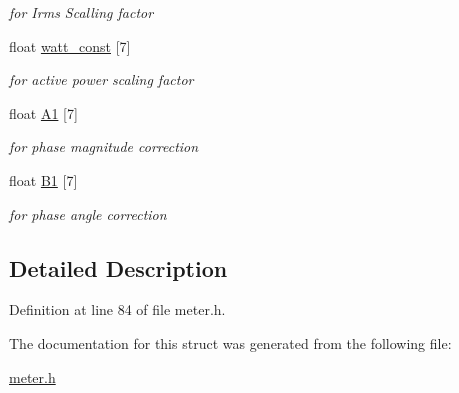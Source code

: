 \begin{DoxyCompactItemize}
\begin{DoxyCompactList}\small\item\em for Irms Scalling factor \end{DoxyCompactList}\item 
\hypertarget{structcoefficient_a7d98671ef11d3a3eb965e37d41df2c24}{float \hyperlink{structcoefficient_a7d98671ef11d3a3eb965e37d41df2c24}{watt\-\_\-const} \mbox{[}7\mbox{]}}\label{structcoefficient_a7d98671ef11d3a3eb965e37d41df2c24}

\begin{DoxyCompactList}\small\item\em for active power scaling factor \end{DoxyCompactList}\item 
\hypertarget{structcoefficient_a957be427fdd8cea2b81d581b497eae93}{float \hyperlink{structcoefficient_a957be427fdd8cea2b81d581b497eae93}{A1} \mbox{[}7\mbox{]}}\label{structcoefficient_a957be427fdd8cea2b81d581b497eae93}

\begin{DoxyCompactList}\small\item\em for phase magnitude correction \end{DoxyCompactList}\item 
\hypertarget{structcoefficient_a9b8f8c5cc3c0ea472337059594684429}{float \hyperlink{structcoefficient_a9b8f8c5cc3c0ea472337059594684429}{B1} \mbox{[}7\mbox{]}}\label{structcoefficient_a9b8f8c5cc3c0ea472337059594684429}

\begin{DoxyCompactList}\small\item\em for phase angle correction \end{DoxyCompactList}\end{DoxyCompactItemize}


\subsection{Detailed Description}


Definition at line 84 of file meter.\-h.



The documentation for this struct was generated from the following file\-:\begin{DoxyCompactItemize}
\item 
\hyperlink{meter_8h}{meter.\-h}\end{DoxyCompactItemize}

